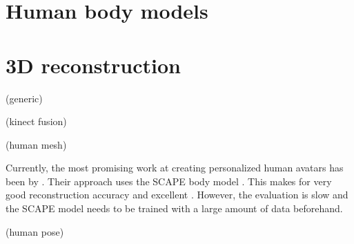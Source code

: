 
\citep{huang2011visual}


\section{Human body models}
\citep{anguelov2005scape}
\citep{baek2012parametric}

\section{3D reconstruction}
(generic)
\citep{fabio2003point}

(kinect fusion)
\citep{izadi2011kinectfusion}
\citep{newcombe2011kinectfusion}
\citep{Whelan12rssw}

(human mesh)

Currently, the most promising work at creating personalized human avatars has been by \citet{weiss2011home}. Their approach uses the SCAPE body model \citep{anguelov2005scape}. This makes for very good reconstruction accuracy and excellent . However, the evaluation is slow and the SCAPE model needs to be trained with a large amount of data beforehand.

\citep{schneider2010fitting}
\citep{ahmed2005automatic}
\citep{tongscanning}
\citep{charpentier2011accurate}
\citep{hirshbergc2011evaluating}

(human pose)
\citep{baak2011data}
